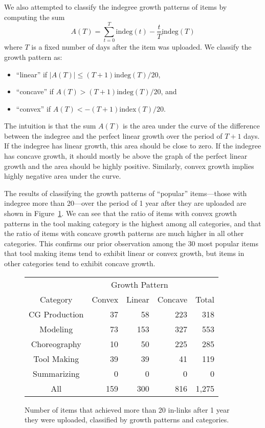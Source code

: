 \documentclass[10pt, a4paper]{article}
\begin{document}
We also attempted to classify the indegree growth patterns of items by computing the sum $$A(T) = \sum_{t=0}^T \mathrm{indeg}(t) - \frac{t}{T} \mathrm{indeg}(T)$$ where $T$ is a fixed number of days after the item was uploaded. We classify the growth pattern as:
\begin{itemize}
 	\item ``linear'' if $|A(T)| \leq (T+1) \mathrm{indeg}(T) / 20$, 
 	\item ``concave'' if $A(T) > (T+1)\mathrm{indeg}(T) / 20$, and
 	\item ``convex'' if $A(T) < -(T+1)\mathrm{index}(T)/20$. 
\end{itemize}
The intuition is that the sum $A(T)$ is the area under the curve of the difference between the indegree and the perfect linear growth over the period of $T+1$ days. If the indegree has linear growth, this area should be close to zero. If the indegree has concave growth, it should mostly be above the graph of the perfect linear growth and the area should be highly positive. Similarly, convex growth implies highly negative area under the curve. 

The results of classifying the growth patterns of ``popular'' items---those with indegree more than 20---over the period of 1 year after they are uploaded are shown in Figure~\ref{growth-patterns-of-popular-items}. We can see that the ratio of items with convex growth patterns in the tool making category is the highest among all categories, and that the ratio of items with concave growth patterns are much higher in all other categories. This confirms our prior observation among the 30 most popular items that tool making items tend to exhibit linear or convex growth, but items in other categories tend to exhibit concave growth.
\begin{figure}
	\centering
	\begin{tabular}{c|r|r|r|r}
	& \multicolumn{3}{c|}{Growth Pattern} & \\
	\cline{2-4}
	Category & \multicolumn{1}{c|}{Convex} & \multicolumn{1}{c|}{Linear} & \multicolumn{1}{c|}{Concave} & \multicolumn{1}{c}{Total} \\
	\hline
	CG Production & 37 & 58 & 223 & 318 \\
	Modeling & 73 & 153 & 327 & 553 \\
	Choreography & 10 & 50 & 225 & 285 \\
	Tool Making & 39 & 39 & 41 & 119 \\
	Summarizing & 0 & 0 & 0 & 0 \\
	\hline
	All & 159 & 300 & 816 & 1,275
	\end{tabular}	
	\caption{Number of items that achieved more than 20 in-links after 1 year they were uploaded, classified by growth patterns and categories.}
	\label{growth-patterns-of-popular-items}
\end{figure}
\end{document}
